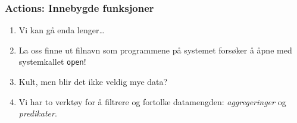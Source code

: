 \documentclass{beamer}
\begin{document}
 \begin{frame}
     \frametitle{Actions: Innebygde funksjoner}
\begin{enumerate}
    \item Vi kan gå enda lenger…

    \item La oss finne ut filnavn som programmene på systemet forsøker å åpne
        med systemkallet \texttt{open}!

\item Kult, men blir det ikke veldig mye data?

\item Vi har to verktøy for å filtrere og fortolke datamengden:
    \emph{aggregeringer} og \emph{predikater}.

\end{enumerate}
 \end{frame}





\end{document}
